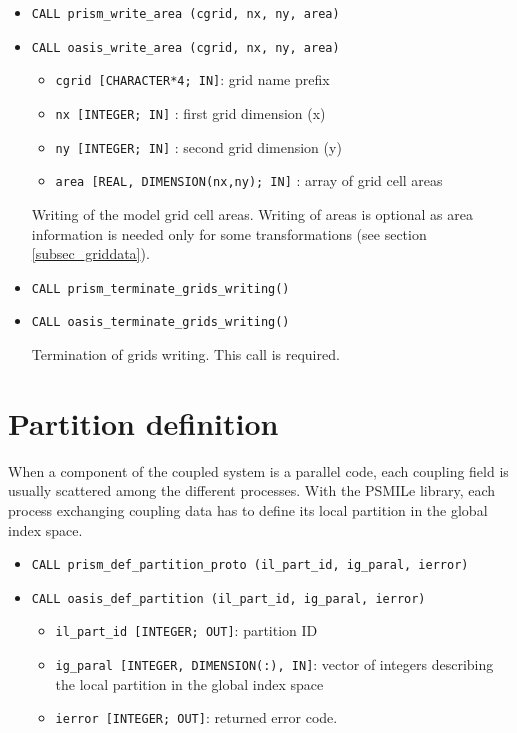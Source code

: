 \begin{itemize}
\item {\tt CALL prism\_write\_area (cgrid, nx, ny, area)}
\item {\tt CALL oasis\_write\_area (cgrid, nx, ny, area)}

 \begin{itemize}
    \item {\tt cgrid [CHARACTER*4; IN]}: grid name prefix
    \item {\tt nx [INTEGER; IN]} : first grid dimension (x)
    \item {\tt ny [INTEGER; IN]} : second grid dimension (y)
    \item {\tt area [REAL, DIMENSION(nx,ny); IN]} : array of grid cell areas
 \end{itemize}
Writing of the model grid cell areas. Writing of areas is optional as
area information is needed only for some transformations (see section
\ref{subsec_griddata}).

\item {\tt CALL prism\_terminate\_grids\_writing()}
\item {\tt CALL oasis\_terminate\_grids\_writing()}

Termination of grids writing.  This call is required.

\end{itemize}

\section{Partition definition}
\label{subsubsec_Partition}

When a component of the coupled system is a parallel code, each
coupling field is usually scattered among the different
processes. With the PSMILe library, each process exchanging coupling data has to
define its local partition in the global index space.

\begin{itemize}


\item {\tt CALL prism\_def\_partition\_proto (il\_part\_id, ig\_paral, ierror)}
\item {\tt CALL oasis\_def\_partition        (il\_part\_id, ig\_paral, ierror)}

   \begin{itemize}
   \item {\tt il\_part\_id [INTEGER; OUT]}: partition ID 
   \item {\tt ig\_paral [INTEGER, DIMENSION(:), IN]}: vector of
   integers describing the local partition in the global index space
   \item {\tt ierror [INTEGER; OUT]}: returned error code.
   \end{itemize}
\end{itemize} 


